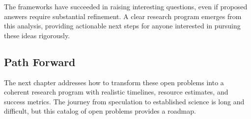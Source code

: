 The frameworks have succeeded in raising interesting questions, even if proposed answers require substantial refinement. A clear research program emerges from this analysis, providing actionable next steps for anyone interested in pursuing these ideas rigorously.

\subsection{Path Forward}

The next chapter addresses how to transform these open problems into a coherent research program with realistic timelines, resource estimates, and success metrics. The journey from speculation to established science is long and difficult, but this catalog of open problems provides a roadmap.
